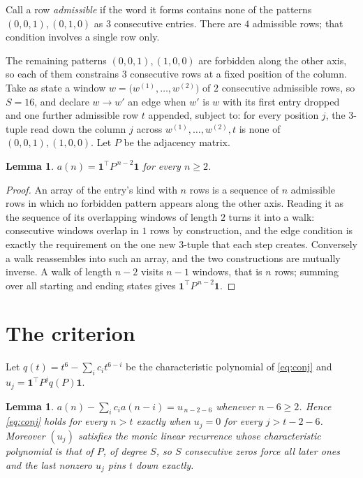 \documentclass[11pt,a4paper]{article}
\theoremstyle{plain}
\newtheorem{lemma}[theorem]{Lemma}
\theoremstyle{definition}
\begin{document}
Call a row \emph{admissible} if the word it forms contains none of the patterns
$(0,0,1), (0,1,0)$ as $3$ consecutive entries. There are $4$ admissible rows; that condition
involves a single row only.

The remaining patterns $(0,0,1), (1,0,0)$ are forbidden along the other axis, so each of them
constrains $3$ consecutive rows at a fixed position of the column. Take as state a
window $w=\bigl(w^{(1)},\dots,w^{(2)}\bigr)$ of $2$ consecutive admissible
rows, so $S=16$, and declare $w\to w'$ an edge when $w'$ is $w$ with its first entry
dropped and one further admissible row $t$ appended, subject to: for every position
$j$, the $3$-tuple read down the column $j$ across $w^{(1)},\dots,w^{(2)},t$
is none of $(0,0,1), (1,0,0)$. Let $P$ be the adjacency matrix.

\begin{lemma}\label{lem:walk}
$a(n)=\mathbf{1}^{\!\top}P^{\,n-2}\mathbf{1}$ for every $n\ge2$.
\end{lemma}

\begin{proof}
An array of the entry's kind with $n$ rows is a sequence of $n$ admissible rows in
which no forbidden pattern appears along the other axis. Reading it as the sequence of its
overlapping windows of length $2$ turns it into a walk: consecutive windows overlap in
$1$ rows by construction, and the edge condition is exactly the requirement on the one
new $3$-tuple that each step creates. Conversely a walk reassembles into such an array,
and the two constructions are mutually inverse. A walk of length $n-2$ visits $n-1$
windows, that is $n$ rows; summing over all starting and ending states gives
$\mathbf{1}^{\!\top}P^{\,n-2}\mathbf{1}$.
\end{proof}

\section{The criterion}

Let $q(t)=t^{6}-\sum_i c_i t^{6-i}$ be the characteristic polynomial of
\eqref{eq:conj} and $u_j=\mathbf{1}^{\!\top}P^{j}q(P)\mathbf{1}$.

\begin{lemma}\label{lem:crit}
$a(n)-\sum_i c_i a(n-i)=u_{\,n-2-6}$ whenever $n-6\ge2$. Hence
\eqref{eq:conj} holds for every $n>t$ exactly when $u_j=0$ for every
$j>t-2-6$. Moreover $(u_j)$ satisfies the monic linear recurrence whose
characteristic polynomial is that of $P$, of degree $S$, so $S$ consecutive zeros force all
later ones and the last nonzero $u_j$ pins $t$ down exactly.
\end{lemma}
\end{document}
